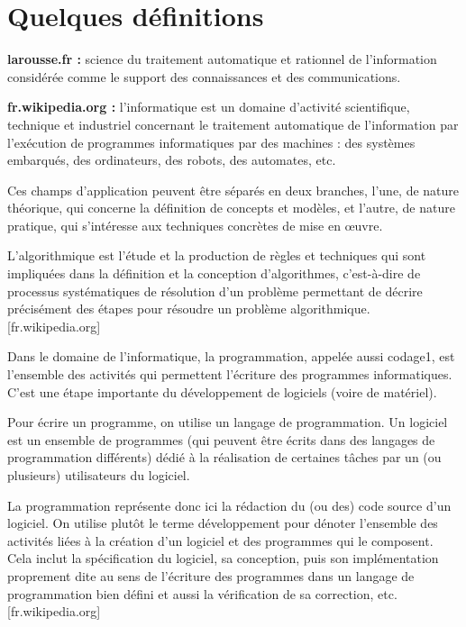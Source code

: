 \section{Quelques définitions}

\begin{defi}[Informatique]
\textbf{larousse.fr :} science du traitement automatique et rationnel de l'information considérée comme le support des connaissances et des communications.

\textbf{fr.wikipedia.org :} l'informatique est un domaine d'activité scientifique, technique et industriel concernant le traitement automatique de l'information par l'exécution de programmes informatiques par des machines : des systèmes embarqués, des ordinateurs, des robots, des automates, etc.

Ces champs d'application peuvent être séparés en deux branches, l'une, de nature théorique, qui concerne la définition de concepts et modèles, et l'autre, de nature pratique, qui s'intéresse aux techniques concrètes de mise en œuvre.
\end{defi}



\begin{defi}[Algorithmique]
L'algorithmique est l'étude et la production de règles et techniques qui sont impliquées dans la définition et la conception d'algorithmes, c'est-à-dire de processus systématiques de résolution d'un problème permettant de décrire précisément des étapes pour résoudre un problème algorithmique. [fr.wikipedia.org]
\end{defi}


\begin{defi}[Programmation]
Dans le domaine de l'informatique, la programmation, appelée aussi codage1, est l'ensemble des activités qui permettent l'écriture des programmes informatiques. C'est une étape importante du développement de logiciels (voire de matériel).

Pour écrire un programme, on utilise un langage de programmation. Un logiciel est un ensemble de programmes (qui peuvent être écrits dans des langages de programmation différents) dédié à la réalisation de certaines tâches par un (ou plusieurs) utilisateurs du logiciel.

La programmation représente donc ici la rédaction du (ou des) code source d'un logiciel. On utilise plutôt le terme développement pour dénoter l'ensemble des activités liées à la création d'un logiciel et des programmes qui le composent. Cela inclut la spécification du logiciel, sa conception, puis son implémentation proprement dite au sens de l'écriture des programmes dans un langage de programmation bien défini et aussi la vérification de sa correction, etc. [fr.wikipedia.org]
\end{defi}



